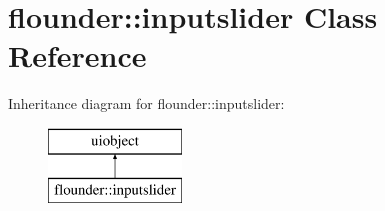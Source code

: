 \hypertarget{classflounder_1_1inputslider}{}\section{flounder\+:\+:inputslider Class Reference}
\label{classflounder_1_1inputslider}
Inheritance diagram for flounder\+:\+:inputslider\+:\begin{figure}[H]
\begin{center}
\leavevmode
\includegraphics[height=2.000000cm]{classflounder_1_1inputslider}
\end{center}
\end{figure}
